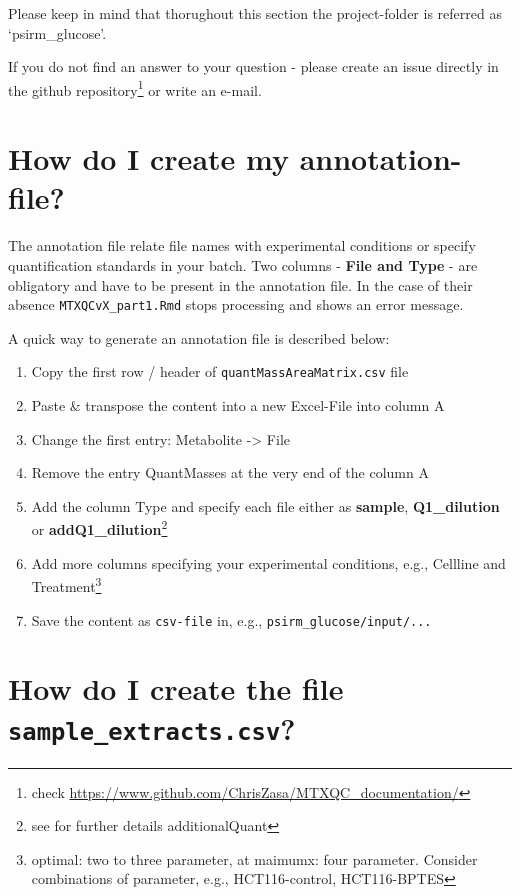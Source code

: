 \documentclass[]{book}
\providecommand{\tightlist}{%
  \setlength{\itemsep}{0pt}\setlength{\parskip}{0pt}}
\let\rmarkdownfootnote\footnote%
\def\footnote{\protect\rmarkdownfootnote}
\theoremstyle{definition}
\theoremstyle{definition}
\theoremstyle{definition}
\theoremstyle{remark}
\begin{document}
Please keep in mind that thorughout this section the project-folder is
referred as `psirm\_glucose'.

If you do not find an answer to your question - please create an issue
directly in the github repository\footnote{check
  \url{https://www.github.com/ChrisZasa/MTXQC_documentation/}} or write
an e-mail.

\section{How do I create my annotation-file?}\label{createannotation}

The annotation file relate file names with experimental conditions or
specify quantification standards in your batch. Two columns -
\textbf{File and Type} - are obligatory and have to be present in the
annotation file. In the case of their absence
\texttt{MTXQCvX\_part1.Rmd} stops processing and shows an error message.

A quick way to generate an annotation file is described below:

\begin{enumerate}
\def\labelenumi{\arabic{enumi}.}
\tightlist
\item
  Copy the first row / header of \texttt{quantMassAreaMatrix.csv} file
\item
  Paste \& transpose the content into a new Excel-File into column A
\item
  Change the first entry: Metabolite -\textgreater{} File
\item
  Remove the entry QuantMasses at the very end of the column A
\item
  Add the column Type and specify each file either as \textbf{sample},
  \textbf{Q1\_dilution} or \textbf{addQ1\_dilution}\footnote{see for
    further details additionalQuant}
\item
  Add more columns specifying your experimental conditions, e.g.,
  Cellline and Treatment\footnote{optimal: two to three parameter, at
    maimumx: four parameter. Consider combinations of parameter, e.g.,
    HCT116-control, HCT116-BPTES}
\item
  Save the content as \texttt{csv-file} in, e.g.,
  \texttt{psirm\_glucose/input/...}
\end{enumerate}

\section{\texorpdfstring{How do I create the file
\texttt{sample\_extracts.csv}?}{How do I create the file sample\_extracts.csv?}}\label{createsampleextracts}
\end{document}
